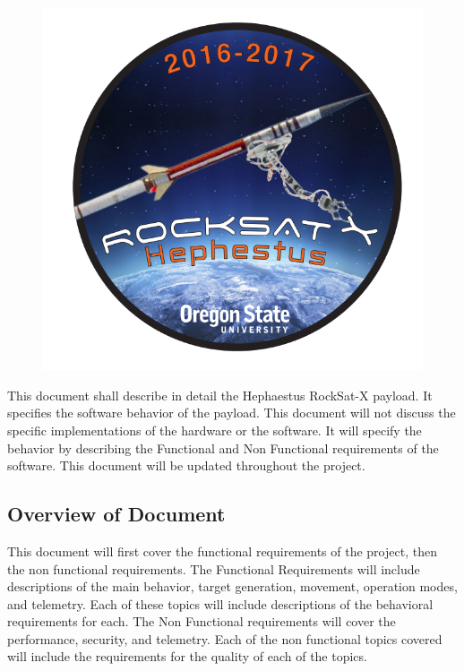 \documentclass[letterpaper,10pt]{article}
\begin{document}
\begin{figure}
\centering
\includegraphics[scale=.25]{logo}
\end{figure}

This document shall describe in detail the Hephaestus RockSat-X payload.
It specifies the software behavior of the payload.
This document will not discuss the specific implementations of the hardware or the software.
It will specify the behavior by describing the Functional and Non Functional requirements of the software.
This document will be updated throughout the project.
\subsection{Overview of Document}
This document will first cover the functional requirements of the project, then the non functional requirements.
The Functional Requirements will include descriptions of the main behavior, target generation, movement, operation modes, and telemetry.
Each of these topics will include descriptions of the behavioral requirements for each.
The Non Functional requirements will cover the performance, security, and telemetry.
Each of the non functional topics covered will include the requirements for the quality of each of the topics.
\end{document}

